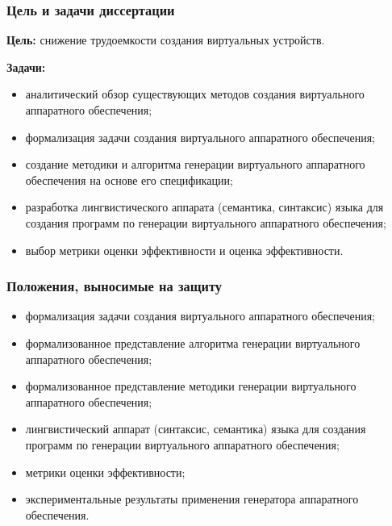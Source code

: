 \begin{frame}%
    \frametitle{Цель и задачи диссертации}
    \textbf{Цель:} снижение трудоемкости создания виртуальных устройств.

    \textbf{Задачи:}
    \begin{itemize}
        \item аналитический обзор существующих методов создания виртуального аппаратного обеспечения;
        \item формализация задачи создания виртуального аппаратного обеспечения;
        \item создание методики и алгоритма генерации виртуального аппаратного обеспечения на основе его спецификации;
        \item разработка лингвистического аппарата (семантика, синтаксис) языка для создания программ по генерации виртуального
            аппаратного обеспечения;
        \item выбор метрики оценки эффективности и оценка эффективности.
    \end{itemize}
\end{frame}


\begin{frame}%
    \frametitle{Положения, выносимые на защиту}
    \begin{itemize}
        \item формализация задачи создания виртуального аппаратного обеспечения;
        \item формализованное представление алгоритма генерации виртуального аппаратного обеспечения;
        \item формализованное представление методики генерации виртуального аппаратного обеспечения;
        \item лингвистический аппарат (синтаксис, семантика) языка для создания программ по генерации виртуального
            аппаратного обеспечения;
        \item метрики оценки эффективности;
        \item экспериментальные результаты применения генератора аппаратного обеспечения.
    \end{itemize}
\end{frame}


